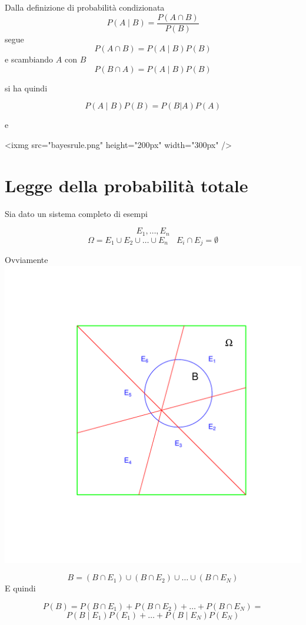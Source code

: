 \documentclass[onecolumn,12pt]{book}\usepackage[]{graphicx}\usepackage[]{color}
\makeatletter
\def\maxwidth{ %
  \ifdim\Gin@nat@width>\linewidth
    \linewidth
  \else
    \Gin@nat@width
  \fi
}
\newenvironment{knitrout}{}{} %
\makeatother
\begin{document}
Dalla  definizione di probabilità condizionata
$$P(A \mid B)=\dfrac{P(A \cap  B)}{P(B)}$$  segue
$$P(A \cap B)=P(A \mid  B) P(B)$$  e scambiando $A$ con $B$
$$P(B \cap A)=P(A \mid  B) P(B)$$
 
si ha quindi
 
$$P(A \mid  B)P(B) = P(B | A) P(A)$$

e

<ixmg src="bayesrule.png" height="200px" width="300px" />

 
\section{Legge della probabilità totale}

Sia dato un sistema completo di esempi 

$$E_1,\ldots,E_n$$
$$\Omega=E_1\cup E_2\cup\ldots\cup E_n\quad E_i\cap E_j=\emptyset$$

Ovviamente
\begin{knitrout}
\color{fgcolor}
\includegraphics[width=\maxwidth]{figure/r-1} 

\end{knitrout}
$$B=(B\cap E_1)\cup (B\cap E_2)\cup\ldots \cup (B\cap E_N)$$
E quindi

$$P(B)=P(B\cap E_1)+P(B\cap E_2)+\ldots+ P(B\cap E_N)=$$
$$ P(B\mid E_1)P(E_1)+\ldots+P(B\mid E_N)P(E_N)$$
\end{document}
